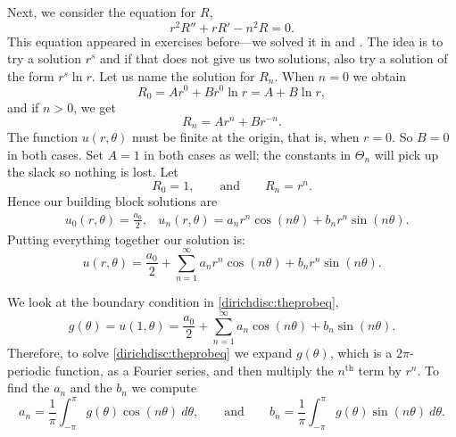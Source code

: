 \documentclass{ximera}
\begin{document}
Next, we consider the equation for $R$,
\begin{equation*}
    r^2 R'' + r R' - n^2 R = 0.
\end{equation*}
This equation appeared in exercises before---we solved it in  and .  The idea is to try a solution $r^s$ and if that does not give us two solutions, also try a solution of the form $r^s \ln r$.  Let us name the solution for $R_n$.  When $n=0$ we obtain
\begin{equation*}
    R_0 = A r^0 + B r^0 \ln r = A + B \ln r ,
\end{equation*}
and if $n > 0$, we get
\begin{equation*}
    R_n = A r^n + B r^{-n} .
\end{equation*}
The function $u(r,\theta)$ must be finite at the origin, that is, when $r=0$. So $B=0$ in both cases.  Set $A=1$ in both cases as well; the constants in $\Theta_n$ will pick up the slack so nothing is lost.  Let
\begin{equation*}
    R_0 = 1 , \qquad \text{and} \qquad R_n = r^n .
\end{equation*}
Hence our building block solutions are
\begin{align*}
    & u_0(r,\theta) = \frac{a_0}{2} ,
    & u_n(r,\theta) = a_n r^n \cos(n \theta) + b_n r^n \sin(n \theta) .
\end{align*}
Putting everything together our solution is:
\begin{equation*}
    u(r,\theta) = \frac{a_0}{2} + \sum_{n=1}^\infty a_n r^n \cos(n \theta) + b_n r^n \sin(n \theta) .
\end{equation*}

We look at the boundary condition in \eqref{dirichdisc:theprobeq},
\begin{equation*}
    g(\theta) = u(1,\theta) = \frac{a_0}{2} + \sum_{n=1}^\infty a_n \cos(n \theta) + b_n \sin(n \theta) .
\end{equation*}
Therefore, to solve \eqref{dirichdisc:theprobeq} we expand $g(\theta)$, which is a $2\pi$-periodic function, as a Fourier series, and then multiply the $n^{\text{th}}$ term by $r^n$.  To find the $a_n$ and the $b_n$ we compute
\begin{equation*}
    a_n = \frac{1}{\pi} \int_{-\pi}^\pi g(\theta) \cos (n\theta) ~ d\theta , \qquad \text{and} \qquad b_n = \frac{1}{\pi} \int_{-\pi}^\pi g(\theta) \sin (n\theta) ~ d\theta.
\end{equation*}
\end{document}
